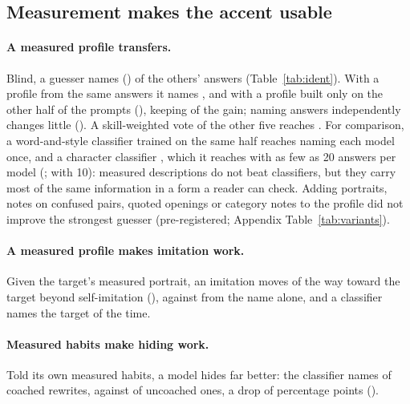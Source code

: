 \documentclass[11pt]{article}
\begin{document}
\subsection{Measurement makes the accent usable}
\label{sec:usable}

\begin{table}[t]
\centering\small
\caption{Identification of other models' answers, run \texttt{oct-23-26}. Own answers are excluded. Chance is \chance. Intervals resample prompts. The weighted vote counts each guesser by its accuracy on the other half of the prompts and names each model once per prompt.}
\label{tab:ident}
\resizebox{\linewidth}{!}{}
\end{table}

\paragraph{A measured profile transfers.}
Blind, a guesser names \accBlind{} (\ciBlind) of the others' answers (Table~\ref{tab:ident}).
With a profile from the same answers it names \accSame{}, and with a profile built only on the other half of the prompts \accHeldPerm{} (\ciHeldPerm), keeping \retention{} of the gain; naming answers independently changes little (\accHeldInd).
A skill-weighted vote of the other five reaches \wvoteHeldPerm{}.
For comparison, a word-and-style classifier trained on the same half reaches \clfHalfMatched{} naming each model once, and a character classifier \charHalfMatched{}, which it reaches with as few as 20 answers per model (\curveTwenty; \curveTen{} with 10): measured descriptions do not beat classifiers, but they carry most of the same information in a form a reader can check.
Adding portraits, notes on confused pairs, quoted openings or category notes to the profile did not improve the strongest guesser (pre-registered; Appendix Table~\ref{tab:variants}).

\paragraph{A measured profile makes imitation work.}
Given the target's measured portrait, an imitation moves \imProfile{} of the way toward the target beyond self-imitation (\imProfileCI), against \imName{} from the name alone, and a classifier names the target \imNamedTargetProfile{} of the time.

\paragraph{Measured habits make hiding work.}
Told its own measured habits, a model hides far better: the classifier names \hideCoached{} of coached rewrites, against \hideUncoached{} of uncoached ones, a drop of \hideDrop{} percentage points (\hideDropCI).
\end{document}
